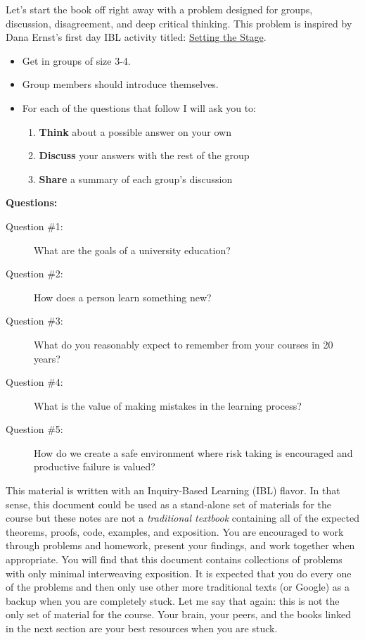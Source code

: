 \begin{problem}
    Let's start the book off right away with a problem designed for groups, discussion,
    disagreement, and deep critical thinking.  This problem is inspired by Dana Ernst's
    first day IBL activity titled: \href{http://danaernst.com/setting-the-stage/}{Setting
    the Stage}.
    \begin{itemize}
        \item Get in groups of size 3-4.
        \item Group members should introduce themselves.
        \item For each of the questions that follow I will ask you to:
            \begin{enumerate}
                \item {\bf Think} about a possible answer on your own
                \item {\bf Discuss} your answers with the rest of the group
                \item {\bf Share} a summary of each group's discussion
            \end{enumerate}
    \end{itemize}
    {\bf Questions:} 
    \begin{description}
        \item[Question \#1:] What are the goals of a university education?
        \item[Question \#2:] How does a person learn something new?
        \item[Question \#3:] What do you reasonably expect to remember from your courses
            in 20 years?
        \item[Question \#4:] What is the value of making mistakes in the learning process?
        \item[Question \#5:] How do we create a safe environment where risk taking is
            encouraged and productive failure is valued?
    \end{description}
\end{problem}


This material is written with an Inquiry-Based Learning (IBL) flavor. In that sense, this
document could be used as a stand-alone set of materials for the course but these notes
are not a {\it traditional textbook} containing all of the expected theorems, proofs,
code, examples, and exposition. You are encouraged to work through problems and homework,
present your findings, and work together when appropriate. You will find that this
document contains collections of problems with only minimal interweaving exposition.  It
is expected that you do every one of the problems and then only use other more traditional
texts (or Google) as a backup when you are completely stuck.  Let me say that again: this
is not the only set of material for the course.  Your brain, your peers, and the books
linked in the next section are your best resources when you are stuck.

